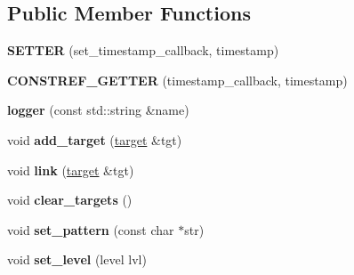 \subsection*{Public Member Functions}
\begin{DoxyCompactItemize}
\item 
{\bfseries S\+E\+T\+T\+ER} (set\+\_\+timestamp\+\_\+callback, timestamp)\hypertarget{classgxx_1_1log_1_1logger_a9e8eee6d96d3cf95f644609a7e299467}{}\label{classgxx_1_1log_1_1logger_a9e8eee6d96d3cf95f644609a7e299467}

\item 
{\bfseries C\+O\+N\+S\+T\+R\+E\+F\+\_\+\+G\+E\+T\+T\+ER} (timestamp\+\_\+callback, timestamp)\hypertarget{classgxx_1_1log_1_1logger_a9519ac057f2caa5518a7bedc034aa276}{}\label{classgxx_1_1log_1_1logger_a9519ac057f2caa5518a7bedc034aa276}

\item 
{\bfseries logger} (const std\+::string \&name)\hypertarget{classgxx_1_1log_1_1logger_a57a7376523eded2fc208655150a24bff}{}\label{classgxx_1_1log_1_1logger_a57a7376523eded2fc208655150a24bff}

\item 
void {\bfseries add\+\_\+target} (\hyperlink{classgxx_1_1log_1_1target}{target} \&tgt)\hypertarget{classgxx_1_1log_1_1logger_aa6ed0c4891fc88603dd803bf113efaf0}{}\label{classgxx_1_1log_1_1logger_aa6ed0c4891fc88603dd803bf113efaf0}

\item 
void {\bfseries link} (\hyperlink{classgxx_1_1log_1_1target}{target} \&tgt)\hypertarget{classgxx_1_1log_1_1logger_ac8968abdae5464d692d37a99676b803c}{}\label{classgxx_1_1log_1_1logger_ac8968abdae5464d692d37a99676b803c}

\item 
void {\bfseries clear\+\_\+targets} ()\hypertarget{classgxx_1_1log_1_1logger_a148f0cfe3888ef3555124fb1765251bf}{}\label{classgxx_1_1log_1_1logger_a148f0cfe3888ef3555124fb1765251bf}

\item 
void {\bfseries set\+\_\+pattern} (const char $\ast$str)\hypertarget{classgxx_1_1log_1_1logger_a9527a43dfe0e6d325084767ae01dcc9b}{}\label{classgxx_1_1log_1_1logger_a9527a43dfe0e6d325084767ae01dcc9b}

\item 
void {\bfseries set\+\_\+level} (level lvl)\hypertarget{classgxx_1_1log_1_1logger_a2fed43a40ddcc2ff88676f7c722fa2fe}{}\label{classgxx_1_1log_1_1logger_a2fed43a40ddcc2ff88676f7c722fa2fe}


\end{DoxyCompactItemize}
